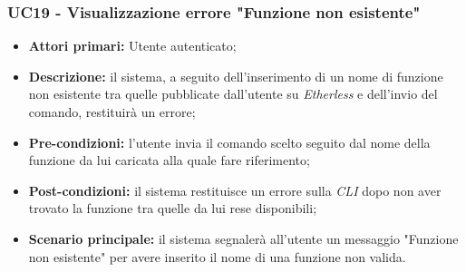 \subsubsection{UC19 - Visualizzazione errore "Funzione non esistente"}
\begin{itemize}
	\item \textbf{Attori primari:} Utente autenticato;
	\item \textbf{Descrizione:} il sistema, a seguito dell'inserimento di un nome di funzione non esistente tra quelle pubblicate dall'utente su \textit{Etherless} e dell'invio del comando, restituirà un errore;
	\item \textbf{Pre-condizioni:} l'utente invia il comando scelto seguito dal nome della funzione da lui caricata alla quale fare riferimento;
	\item \textbf{Post-condizioni:} il sistema restituisce un errore sulla \textit{CLI\glo} dopo non aver trovato la funzione tra quelle da lui rese disponibili;
	\item \textbf{Scenario principale:} il sistema segnalerà all'utente un messaggio "Funzione non esistente" per avere inserito il nome di una funzione non valida.
\end{itemize}
